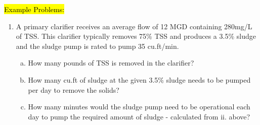                 \hl{Example Problems:}\\
                    \begin{enumerate}
                        \item A primary clarifier receives an average flow of 12 MGD containing 280mg/L of TSS.  This clarifier typically removes 75\% TSS  and produces a 3.5\% sludge and the sludge pump is rated to pump 35 cu.ft/min.
                            \begin{enumerate}[a.]
                                \item How many pounds of TSS is removed in the clarifier?

                                \item How many cu.ft of sludge at the given 3.5\% sludge needs to be pumped per day to remove the solids?

                                \item How many minutes would the sludge pump need to be operational each day to pump the required amount of sludge - calculated from ii.  above?


\end{enumerate}
\end{enumerate}
